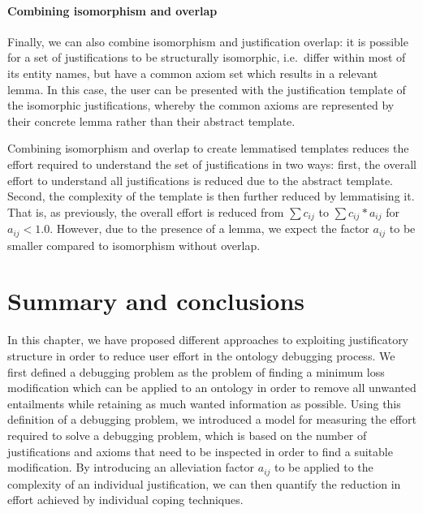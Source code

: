\paragraph{Combining isomorphism and overlap}

Finally, we can also combine isomorphism and justification overlap: it is possible for a set of justifications to be structurally isomorphic, i.e.\ differ within most of its entity names, but have a common axiom set which results in a relevant lemma. In this case, the user can be presented with the justification template \jtemplate of the isomorphic justifications, whereby the common axioms are represented by their concrete lemma rather than their abstract template.

Combining isomorphism and overlap to create lemmatised templates reduces the effort required to understand the set of justifications in two ways: first, the overall effort to understand all justifications is reduced due to the abstract template. Second, the complexity of the template is then further reduced by lemmatising it. That is, as previously, the overall effort is reduced from $\sum c_{ij}$ to $\sum c_{ij} * a_{ij}$ for $a_{ij} < 1.0$. However, due to the presence of a lemma, we expect the factor $a_{ij}$ to be smaller compared to isomorphism without overlap.





\section{Summary and conclusions}
In this chapter, we have proposed different approaches to exploiting justificatory structure in order to reduce user effort in the ontology debugging process. We first defined a debugging problem as the problem of finding a minimum loss modification which can be applied to an ontology in order to remove all unwanted entailments while retaining as much wanted information as possible. Using this definition of a debugging problem, we introduced a model for measuring the effort required to solve a debugging problem, which is based on the number of justifications and axioms that need to be inspected in order to find a suitable modification. By introducing an alleviation factor $a_{ij}$ to be applied to the complexity of an individual justification, we can then quantify the reduction in effort achieved by individual coping techniques.

